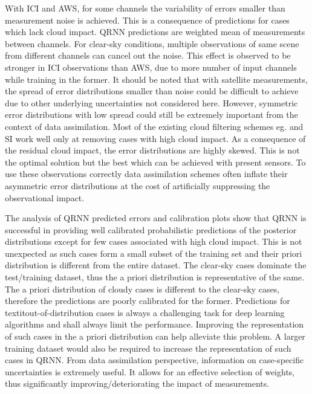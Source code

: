 \documentclass[amt, manuscript]{copernicus}
\begin{document}
With ICI and AWS, for some channels the variability of errors smaller than measurement noise is achieved. This is a consequence of predictions for cases which lack cloud impact. QRNN predictions are weighted mean of measurements between channels. For clear-sky conditions, multiple observations of same scene from different channels can cancel out the noise. This effect is observed to be stronger in ICI observations than AWS, due to more number of input channels while training in the former. It should be noted that with satellite measurements, the spread of error distributions smaller than noise could be difficult to achieve due to other underlying uncertainties not considered here. However, symmetric error distributions with low spread could still be extremely important from the context of data assimilation. Most of the existing cloud filtering schemes eg. \cite{buehler:aclou:07} and SI \cite{} work well only at removing cases with high cloud impact. As a consequence of the residual cloud impact, the error distributions are highly skewed. This is not the optimal solution but the best which can be achieved with present sensors. To use these observations correctly data assimilation schemes often inflate their asymmetric error distributions at the cost of artificially suppressing the observational impact.  

The analysis of QRNN predicted errors and calibration plots show that QRNN is successful in providing well calibrated probabilistic predictions of the posterior distributions except for few cases associated with high cloud impact. This is not unexpected as such cases form a small subset of the training set and their priori distribution is different from the entire dataset. The clear-sky cases dominate the test/training dataset, thus the a priori distribution is representative of the same. The a priori distribution of cloudy cases is different to the clear-sky cases, therefore the predictions are poorly calibrated for the former. Predictions for textit{out-of-distribution} cases is always a challenging task for deep learning algorithms and  shall always limit the performance. Improving the representation of such cases in the a priori distribution can help alleviate this problem. A larger training dataset would also be required to increase the representation of such cases in QRNN. From data assimilation perspective, information on case-specific uncertainties is extremely useful. It allows for an effective selection of weights, thus significantly improving/deteriorating the impact of measurements. 
\end{document}
